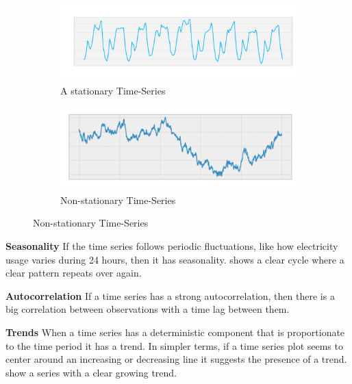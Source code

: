 \begin{figure}[h!]
    \centering
    \caption{Examples of stationarity}
    \label{fig:time-series-examples-stationary-and-non-stationary}
    \begin{subfigure}[b]{0.4\textwidth}
        \includegraphics[width=\textwidth]{./figs/illustrations/time-series_example_stationary.png}
        \hfill
        \caption{A stationary Time-Series}
        \label{fig:stationary-time-series}
    \end{subfigure}
    \begin{subfigure}[b]{0.4\textwidth}
        \includegraphics[width=\textwidth]{./figs/illustrations/time-series_example_non-stationary.png}
        \hfill
        \caption{Non-stationary Time-Series}
        \label{fig:non-stationary-time-series}
    \end{subfigure}
\end{figure}

\textbf{Seasonality}
If the time series follows periodic fluctuations, like how electricity usage varies during 24 hours,
then it has seasonality.  shows a clear cycle where
a clear pattern repeats over again.

\textbf{Autocorrelation}
If a time series has a strong autocorrelation, then there is a big
correlation between observations with a time lag between them.

\textbf{Trends}
When a time series has a deterministic component that is proportionate to the time period it has a trend.
In simpler terms, if a time series plot seems to center around an increasing or decreasing line it suggests the presence of a trend.
 show a series with a clear growing trend.

